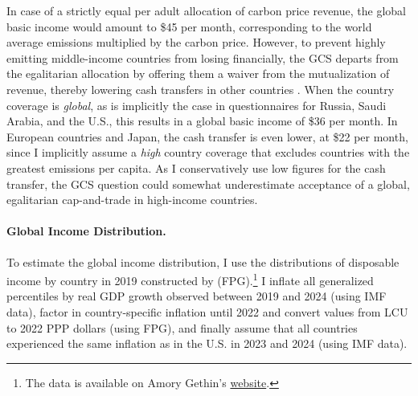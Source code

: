 \documentclass[12pt,english]{article}
\begin{document}
\begin{bibunit}
In case of a strictly equal per adult allocation of carbon price revenue, the global basic income would amount to \$45 per month, corresponding to the world average emissions multiplied by the carbon price. However, to prevent highly emitting middle-income countries from losing financially, the GCS departs from the egalitarian allocation by offering them a waiver from the mutualization of revenue, thereby lowering cash transfers in other countries \citep{fabre_plan_2024}. 
When the country coverage is \textit{global}, as is implicitly the case in questionnaires for Russia, Saudi Arabia, and the U.S., this results in a global basic income of \$36 per month. 
In European countries and Japan, the cash transfer is even lower, at \$22 per month, since I implicitly assume a \textit{high} country coverage %
that excludes countries with the greatest emissions per capita. 
As I conservatively use low figures for the cash transfer, the GCS question could somewhat underestimate acceptance of a global, egalitarian cap-and-trade in high-income countries. 


\paragraph{Global Income Distribution.}

To estimate the global income distribution, I use the distributions of disposable income by country in 2019 constructed by \cite{fisher-post_government_2023} (FPG).\footnote{The data is available on Amory Gethin's \href{https://www.dropbox.com/scl/fi/rd1d7rke0wwwr6948ea67/fisher-gethin-redistribution-2025-01-10.dta}{website}.} I inflate all generalized percentiles by real GDP growth observed between 2019 and 2024 (using IMF data), factor in country-specific inflation until 2022 and convert values from LCU to 2022 PPP dollars (using FPG), and finally assume that all countries experienced the same inflation as in the U.S. in 2023 and 2024 (using IMF data). 


\end{bibunit}
\end{document}
